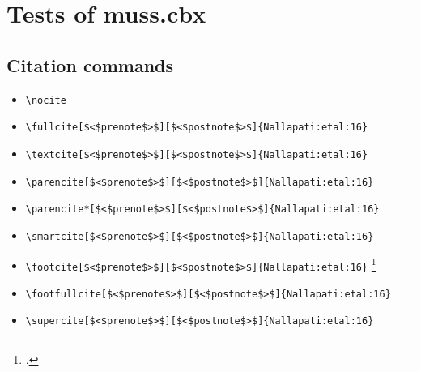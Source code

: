 \newpage

\section{Tests of muss.cbx}

\subsection{Citation commands}

\begin{itemize}
\item \verb=\nocite= \nocite{VanValin:05} \nocite{Abney:87} \nocite{Bach:80,Bach:81} \nocite{Zwicky:93} \nocite{Haagsma:etal:19-casting} \nocite{Corbett:etal:eds:93-heads} \nocite{Mueller:20-grammatical} \nocite{Nallapati:etal:16} \nocite{Penn:99-optimized} \nocite{McConnel:97-PC-PATR}
\item \verb=\fullcite[$<$prenote$>$][$<$postnote$>$]{Nallapati:etal:16}= \newline  {}
\item \verb=\textcite[$<$prenote$>$][$<$postnote$>$]{Nallapati:etal:16}= \newline \textcite[$<$prenote$>$][$<$postnote$>$]{Nallapati:etal:16}
\item \verb=\parencite[$<$prenote$>$][$<$postnote$>$]{Nallapati:etal:16}= \newline \parencite[$<$prenote$>$][$<$postnote$>$]{Nallapati:etal:16}
\item \verb=\parencite*[$<$prenote$>$][$<$postnote$>$]{Nallapati:etal:16}= \newline \parencite*[$<$prenote$>$][$<$postnote$>$]{Nallapati:etal:16}
\item \verb=\smartcite[$<$prenote$>$][$<$postnote$>$]{Nallapati:etal:16}= \newline \smartcite[$<$prenote$>$][$<$postnote$>$]{Nallapati:etal:16}
\item \verb=\footcite[$<$prenote$>$][$<$postnote$>$]{Nallapati:etal:16}= \newline \footcite[$<$prenote$>$][$<$postnote$>$]{Nallapati:etal:16}
\item \verb=\footfullcite[$<$prenote$>$][$<$postnote$>$]{Nallapati:etal:16}= \newline  {}
\item \verb=\supercite[$<$prenote$>$][$<$postnote$>$]{Nallapati:etal:16}= \newline \supercite[$<$prenote$>$][$<$postnote$>$]{Nallapati:etal:16}

\end{itemize}
